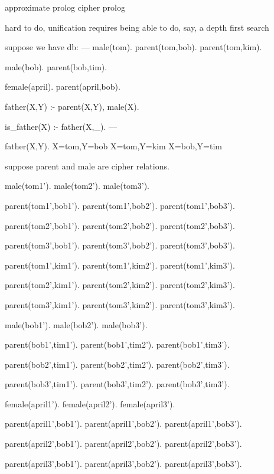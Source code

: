 approximate prolog
cipher prolog

hard to do, unification requires being able to do, say, a depth first search

suppose we have db:
---
male(tom).
parent(tom,bob).
parent(tom,kim).

male(bob).
parent(bob,tim).

female(april).
parent(april,bob).

father(X,Y) :- parent(X,Y), male(X).

is_father(X) :- father(X,_).
---

father(X,Y).
    X=tom,Y=bob
    X=tom,Y=kim
    X=bob,Y=tim

suppose parent and male are cipher relations.

male(tom1').
male(tom2').
male(tom3').

parent(tom1',bob1').
parent(tom1',bob2').
parent(tom1',bob3').

parent(tom2',bob1').
parent(tom2',bob2').
parent(tom2',bob3').

parent(tom3',bob1').
parent(tom3',bob2').
parent(tom3',bob3').

parent(tom1',kim1').
parent(tom1',kim2').
parent(tom1',kim3').

parent(tom2',kim1').
parent(tom2',kim2').
parent(tom2',kim3').

parent(tom3',kim1').
parent(tom3',kim2').
parent(tom3',kim3').

male(bob1').
male(bob2').
male(bob3').

parent(bob1',tim1').
parent(bob1',tim2').
parent(bob1',tim3').

parent(bob2',tim1').
parent(bob2',tim2').
parent(bob2',tim3').

parent(bob3',tim1').
parent(bob3',tim2').
parent(bob3',tim3').

female(april1').
female(april2').
female(april3').

parent(april1',bob1').
parent(april1',bob2').
parent(april1',bob3').

parent(april2',bob1').
parent(april2',bob2').
parent(april2',bob3').

parent(april3',bob1').
parent(april3',bob2').
parent(april3',bob3').


